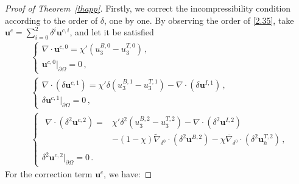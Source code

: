 \documentclass[pdflatex,sn-mathphys-num]{sn-jnl}%
\theoremstyle{thmstyleone}%
\theoremstyle{thmstyletwo}%
\theoremstyle{thmstylethree}%
\theoremstyle{thmstyletwo}
\begin{document}
\begin{proof}[Proof of Theorem~{\upshape\ref{thapp}}]
Firstly, we correct the incompressibility condition according to the order of $\delta$, one by one. By observing the order of \eqref{2.35}, take $\boldsymbol{u}^c=\sum_{i=0}^2\delta^i\boldsymbol{u}^{c,i}$, and let it be satisfied
\begin{align}
	&\begin{cases}
		\nabla \cdot \boldsymbol u^{c,0}=\chi'({u}_3^{B,0}-{u}_3^{T,0})\,,\\
		\boldsymbol u^{c,0}|_{\partial\Omega}=0\,,
	\end{cases}\label{2.36}\\
	&\begin{cases}
		\nabla \cdot (\delta\boldsymbol u^{c,1})=\chi'\delta({u}_3^{B,1}-{u}_3^{T,1})-\nabla\cdot(\delta\boldsymbol{u}^{I,1})\,,\\
		\delta\boldsymbol u^{c,1}|_{\partial\Omega}=0\,,
	\end{cases}\label{2.37}\\
	&		\begin{cases}
		\begin{aligned}
			\nabla \cdot (\delta^2\boldsymbol u^{c,2})=
			&\chi'\delta^2({u}_3^{B,2}-{u}_3^{T,2})
			-\nabla\cdot(\delta^2\boldsymbol{u}^{I,2})
			\\
			&-
			(1-\chi)\tilde{\nabla}_{\delta^0}\cdot(\delta^2\boldsymbol u^{B,2})
			-\chi\bar{\nabla}_{\delta^0}\cdot(\delta^2\boldsymbol u_h^{T,2})\,,
		\end{aligned}\\
		\delta^2\boldsymbol u^{c,2}|_{\partial\Omega}=0\,.
	\end{cases}\label{2.38}
\end{align}
For the correction term $\boldsymbol{u}^c$, we have:	


\end{proof}
\end{document}
